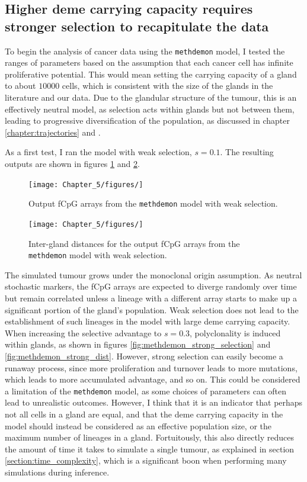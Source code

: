 \subsection{Higher deme carrying capacity requires stronger selection to
recapitulate the data}
To begin the analysis of cancer data using the \texttt{methdemon} model, I tested the
ranges of parameters based on the assumption that each cancer cell has infinite
proliferative potential. This would mean setting the carrying capacity of a gland
to about $10000$ cells, which is consistent with the size of the glands in the
literature \cite{sottoriva_big_2015} and our data. Due to the glandular
structure of the tumour, this is an effectively neutral model, as selection
acts within glands but not between them, leading to progressive diversification
of the population, as discussed in chapter \ref{chapter:trajectories} and
\cite{noble_spatial_2022}.\par
As a first test, I ran the model with weak selection, $s=0.1$. The resulting
outputs are shown in figures \ref{fig:methdemon_weak_selection} and
\ref{fig:methdemon_weak_dist}.

\begin{figure}[h]
    \centering
    \texttt{[image: Chapter\_5/figures/]}
    \caption{Output fCpG arrays from the \texttt{methdemon} model with weak
    selection.}
    \label{fig:methdemon_weak_selection}
\end{figure}

\begin{figure}[h]
    \centering
    \texttt{[image: Chapter\_5/figures/]}
    \caption{Inter-gland distances for the output fCpG arrays from the
    \texttt{methdemon} model with weak selection.}
    \label{fig:methdemon_weak_dist}
\end{figure}

The simulated tumour grows under the monoclonal origin assumption. As neutral
stochastic markers, the fCpG arrays are expected to diverge randomly over time
but remain correlated unless a lineage with a different array starts to make up
a significant portion of the gland's population. Weak selection does not lead
to the establishment of such lineages in the model with large deme carrying
capacity. When increasing the selective advantage to $s=0.3$, polyclonality is
induced within glands, as shown in figures \ref{fig:methdemon_strong_selection}
and \ref{fig:methdemon_strong_dist}. However, strong selection can easily
become a runaway process, since more proliferation and turnover leads to more
mutations, which leads to more accumulated advantage, and so on. This could be
considered a limitation of the \texttt{methdemon} model, as some choices of
parameters can often lead to unrealistic outcomes. However, I think that it is
an indicator that perhaps not all cells in a gland are equal, and that the deme
carrying capacity in the model should instead be considered as an effective
population size, or the maximum number of lineages in a gland. Fortuitously,
this also directly reduces the amount of time it takes to simulate a single
tumour, as explained in section \ref{section:time_complexity}, which is a
significant boon when performing many simulations during inference.

